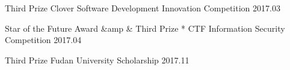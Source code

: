 



\begin{cvhonors}
  \cvhonor
    {Third Prize} %
    {Clover Software Development Innovation Competition} %
    {2017.03} %

  \cvhonor
    {Star of the Future Award &amp \& Third Prize} %
    {* CTF Information Security Competition} %
    {2017.04} %

  \cvhonor
    {Third Prize} %
    {Fudan University Scholarship} %
    {2017.11} %

\end{cvhonors}

